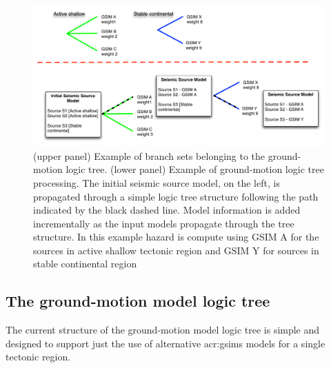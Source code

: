 %
\begin{figure}[!ht]
\centering
\includegraphics[width=\textwidth]{./Pictures/lts/logic_tree_gsim.pdf}
\caption{(upper panel) Example of branch sets belonging to the ground-motion 
logic tree. (lower panel) Example of ground-motion logic tree processing. 
The initial seismic source model, on the left,  is propagated through a simple 
logic tree structure following the path indicated by the black dashed line.
Model information is added incrementally as the input models propagate 
through the tree structure. In this example hazard is compute using GSIM A
for the sources in active shallow tectonic region and GSIM Y for sources in
stable continental region}
\label{fig:logic_tree_gsim}
\end{figure}
%
%
\subsection{The ground-motion model logic tree}
The current structure of the ground-motion model logic tree is 
simple and designed to support just the use of alternative 
\glspl{acr:gsim} models for a single tectonic region.
%
